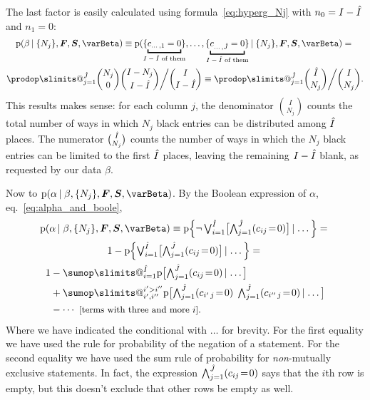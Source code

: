 \documentclass[\ifafour a4paper,12pt,\else a5paper,10pt,\fi%
onecolumn,oneside,article,%
british%
]{memoir}
\makeatletter
\theoremstyle{remark}
\theoremstyle{innote}
\def\sum{\DOTSI\sumop\slimits@}
\def\prod{\DOTSI\prodop\slimits@}
\newcommand*{\pf}{\mathrm{p}}%
\renewcommand*{\|}[1][]{\nonscript\,#1\vert\nonscript\;\mathopen{}}
\newcommand*{\eqn}{eq.}%
\newcommand*{\tland}{\mathop{\textstyle\bigwedge}\nolimits}
\newcommand*{\tlor}{\mathop{\textstyle\bigvee}\nolimits}
\newcommand*{\yI}{\varBeta}
\newcommand*{\eq}{\mathrel{\!=\!}}
\newcommand*{\yF}{\bm{F}}
\newcommand*{\ySS}{S}
\newcommand*{\yS}{\bm{\ySS}}
\DeclarePairedDelimiter\tu{\{}{\}}
\newcommand*{\yIh}{\Hat{I}}
\newcommand*{\yJh}{\Hat{J}}
\newcommand*{\ka}{\alpha}
\newcommand*{\kb}{\beta}
\makeatother
\begin{document}
The last factor is easily calculated using formula~\eqref{eq:hyperg_Nj}
with $n_{0}=I-\yIh$ and $n_{1}=0$:
\begin{multline}
  \label{eq:kb_given_stats}
  \pf( \kb \|\tu{N_{j}},  \yF, \yS, \yI) \equiv
  \pf(\tu{\underbracket{c_{\dotso,1}=0}_{\mathclap{\text{$I-\yIh$ of them}}}},
  \dotsc,
  \tu{\underbracket{c_{\dotso,\yJh}=0}_{\mathclap{\text{$I-\yIh$ of them}}}}
  \|\tu{N_{j}},  \yF, \yS, \yI)
  ={}\\
  \prod_{j=1}^{\yJh}
  \binom{N_{j}}{0}\binom{I-N_{j}}{I-\yIh}
  \bigg/ \binom{I}{I-\yIh}
  \equiv
  \prod_{j=1}^{\yJh}
\binom{\yIh}{N_{j}}\bigg/ \binom{I}{N_{j}}.  
\end{multline}
This results makes sense: for each column $j$, the denominator
$\binom{I}{N_{j}}$ counts the total number of ways in which $N_{j}$ black
entries can be distributed among $\yIh$ places. The numerator
$\binom{\yIh}{N_{j}}$ counts the number of ways in which the $N_{j}$ black
entries can be limited to the first $\yIh$ places, leaving the remaining
$I-\yIh$ blank, as requested by our data $\kb$.


Now to $\pf( \ka \|\kb, \tu{N_{j}}, \yF, \yS, \yI)$. By the Boolean
expression of $\ka$, \eqn~\eqref{eq:alpha_and_boole},
\begin{multline}
  \label{eq:p_ka_boole}
  \pf( \ka \|\kb, \tu{N_{j}}, \yF, \yS, \yI) \equiv
  \pf\Bigl\{
\lnot \tlor_{i=1}^{\yIh} \bigl[
\tland_{j=1}^{\yJh} (c_{ij} \eq 0)
    \bigr]
    \|\dotso \Bigr\} ={}\\
    1-
  \pf\Bigl\{
\tlor_{i=1}^{\yIh} \bigl[
\tland_{j=1}^{\yJh} (c_{ij} \eq 0)
    \bigr]
    \|\dotso \Bigr\} ={}\\
    \begin{aligned}[b]
    1&-
\sum_{i=1}^{\yIh} \pf\bigl[
\tland_{j=1}^{\yJh} (c_{ij} \eq 0) \|\dotso \bigr]
\\&+
\sum_{i',i''}^{i'> i''} \pf\bigl[
\tland_{j=1}^{\yJh} (c_{i'\,j} \eq 0)\;
\tland_{j=1}^{\yJh} (c_{i''\,j} \eq 0)
\|\dotso \bigr]
\\&- \dotsb\text{ \small[terms with three and more $i$]}.
    \end{aligned}
\end{multline}
Where we have indicated the conditional with $\dotso$ for brevity. For the
first equality we have used the rule for probability of the negation of a
statement. For the second equality we have used the sum rule of probability
for \emph{non}-mutually exclusive statements. In fact, the expression
$\tland_{j=1}^{\yJh} (c_{ij} \eq 0)$ says that the $i$th row is empty, but
this doesn't exclude that other rows be empty as well.
\end{document}
